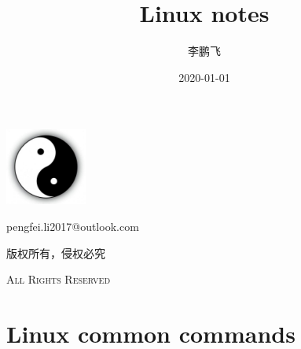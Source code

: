 \documentclass[UTF8,fancyhdr,a4paper]{ctexart}
\title{Linux notes}
\author{李鹏飞}
\date{2020-01-01}
\begin{document}
\begin{titlepage}
\maketitle
{}
\centering
\vspace{10cm}
\includegraphics[width = 0.2\textwidth]{YinYang.jpg}\par
\vspace{1cm}
{\huge pengfei.li2017@outlook.com}\par
\vspace{0.5cm}
{\small 版权所有，侵权必究}\par
\vspace{0.5cm}
{\scshape \small All Rights Reserved}
\end{titlepage}

\tableofcontents
{}%
\clearpage
\listoffigures
{}
\clearpage
\listoftables
{}
\clearpage

\newpage
{}
\section{Linux common commands}
\end{document}
